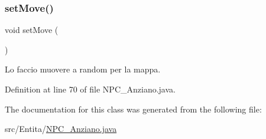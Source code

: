 \subsubsection{\texorpdfstring{set\+Move()}{setMove()}}
{\footnotesize\ttfamily void set\+Move (\begin{DoxyParamCaption}{ }\end{DoxyParamCaption})}



Lo faccio muovere a random per la mappa. 



Definition at line 70 of file N\+P\+C\+\_\+\+Anziano.\+java.



The documentation for this class was generated from the following file\+:\begin{DoxyCompactItemize}
\item 
src/\+Entita/\hyperlink{_n_p_c___anziano_8java}{N\+P\+C\+\_\+\+Anziano.\+java}\end{DoxyCompactItemize}
